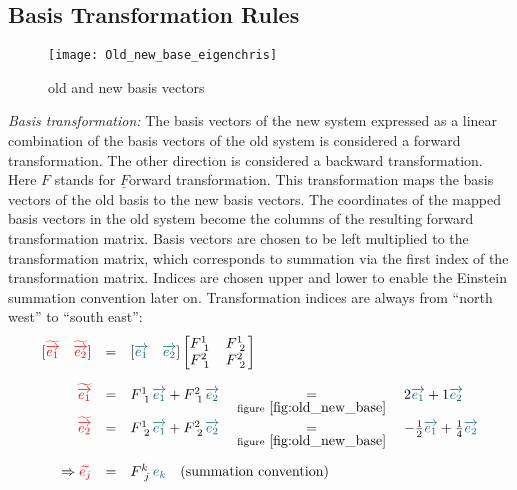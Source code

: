 \subsection{Basis Transformation Rules}

\begin{figure}[h]
    \centering
    \texttt{[image: Old\_new\_base\_eigenchris]}
    \caption{old and new basis vectors}
    \label{fig:old_new_base}
\end{figure}

\emph{Basis transformation:} The basis vectors of the new system expressed as a linear
combination of the basis vectors of the old system is considered a forward transformation.
The other direction is considered a backward transformation.\\

Here $F$ stands for $\underline{F}$orward transformation. This transformation maps the
basis vectors of the old basis to the new basis vectors. The coordinates of the mapped
basis vectors in the old system become the columns of the resulting forward transformation
matrix. Basis vectors are chosen to be left multiplied to the transformation matrix, which
corresponds to summation via the first index of the transformation matrix. Indices are
chosen upper and lower to enable the Einstein summation convention later on.
Transformation indices are always from ``north west'' to ``south east'':
\begin{equation}
    \label{eq:forward_trafo}
    \begin{array}{rcl}
        [\hdbtv{1} \quad \hdbtv{2}] & = &
        [\hdbv{1} \quad \hdbv{2}]
        \begin{bmatrix}
            F^{1~}_{~1} & F^{1~}_{~2} \\
            F^{2~}_{~1} & F^{2~}_{~2}
        \end{bmatrix} \\
        \noalign{\vskip10pt}
        \hdbtv{1} & = & F^{1~}_{~1}\hdbv{1} + F^{2~}_{~1}\hdbv{2}
        \quad \underset{\text{figure}~\ref{fig:old_new_base}}{=} \quad
        2 \hdbv{1} + 1 \hdbv{2} \\
        \hdbtv{2} & = & F^{1~}_{~2}\hdbv{1} + F^{2~}_{~2}\hdbv{2}
        \quad \underset{\text{figure}~\ref{fig:old_new_base}}{=} \quad
        -\frac{1}{2}\hdbv{1} + \frac{1}{4}\hdbv{2} \\
        \noalign{\vskip10pt}
        \Rightarrow \hdbtvc{j} & = &
        F^{k~}_{~j} \hdbvc{k} \quad\text{(summation convention)}
    \end{array}
\end{equation}


